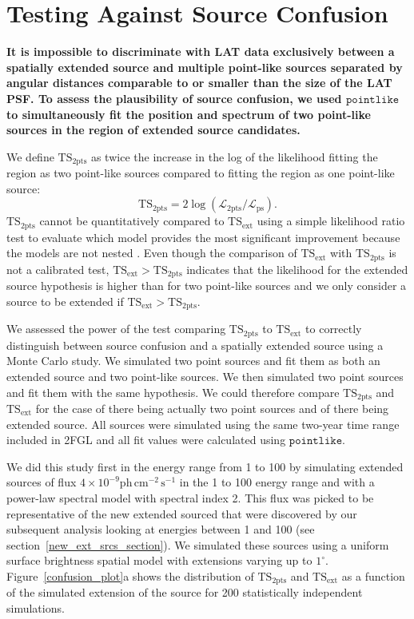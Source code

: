 \documentclass[12pt,preprint]{aastex}
\newcommand{\gev}{\text{GeV}\xspace}
\newcommand{\phflux}{\ensuremath{\text{ph}\,\text{cm}^{-2}\,\text{s}^{-1}}\xspace}
\newcommand{\tsext}{{\ensuremath{\text{TS}_{\text{ext}}}}\xspace}
\newcommand{\tsinc}{\ensuremath{\text{TS}_{\text{2pts}}}\xspace}
\newcommand{\likelihood}{\ensuremath{\mathcal{L}}\xspace}
\newcommand{\pointlike}{\ensuremath{\mathtt{pointlike}}\xspace}
\newcommand{\degree}{^\circ\xspace}
\newcommand{\newtext}[1]{{\bfseries \color{red}#1}}
\begin{document}
\section{Testing Against Source Confusion}
\label{dual_localization_method}

\newtext{
It is impossible to discriminate with LAT data exclusively between a
spatially extended source and multiple point-like sources separated by
angular distances comparable to or smaller than the size of the LAT PSF.
To assess the plausibility of source confusion, we used \pointlike to
simultaneously fit the position and spectrum of two point-like sources
in the region of extended source candidates.

We define \tsinc as twice the increase in the log of the likelihood
fitting the region as two point-like sources compared to fitting the
region as one point-like source:
\begin{equation}
  \tsinc=2\log(\likelihood_\text{2pts}/\likelihood_\text{ps}).
\end{equation} 
\tsinc cannot be quantitatively compared to \tsext using a
simple likelihood ratio test to evaluate which model provides the
most significant improvement because the models are not nested
\citep{statistics_with_care}.  Even though the comparison of \tsext
with \tsinc is not a calibrated test, $\tsext>\tsinc$ indicates that
the likelihood for the extended source hypothesis is higher than for
two point-like sources and we only consider a source to be extended
if $\tsext>\tsinc$.

We assessed the power of the test comparing \tsinc to \tsext to correctly
distinguish between source confusion and a spatially extended source using
a Monte Carlo study.  We simulated two point sources and fit them as both
an extended source and two point-like sources.  We then simulated two
point sources and fit them with the same hypothesis. We could therefore
compare \tsinc and \tsext for the case of there being actually two point
sources and of there being extended source.  All sources were simulated
using the same two-year time range included in 2FGL and all fit values
were calculated using \pointlike.

We did this study first in the energy range from 1 \gev to 100 \gev by
simulating extended sources of flux $4\times10^{-9} \phflux$ in the 1
\gev to 100 \gev energy range and with a power-law spectral model with
spectral index 2.  This flux was picked to be representative of the
new extended sourced that were discovered by our subsequent analysis
looking at energies between 1 \gev and 100 \gev
(see section~\ref{new_ext_srcs_section}).
We simulated these sources using a uniform surface brightness spatial
model with extensions varying
up to $1\degree$.  Figure~\ref{confusion_plot}a shows 
the distribution of \tsinc and \tsext as a
function of the simulated extension of the source
for 200 statistically independent simulations.


}
\end{document}
